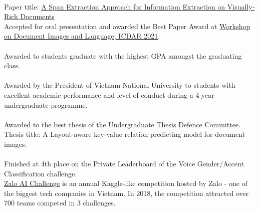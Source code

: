 \\
Paper title: \href{https://aps.arxiv.org/abs/2106.00978}{A Span Extraction Approach for Information Extraction on Visually-Rich Documents}\\
\indent Accepted for oral presentation and awarded the Best Paper Award at \href{https://dil2021.github.io/index.html}{Workshop on Document Images and Language, ICDAR 2021}.\\

\\
Awarded to students graduate with the highest GPA amongst the graduating
class.\\

\\
Awarded by the President of Vietnam National University to students with
excellent academic performance and level of conduct during a 4-year
undergraduate programme.\\

\\
Awarded to the best thesis of the Undergraduate Thesis Defence Committee.\\
\indent Thesis title: A Layout-aware key-value relation predicting model for
document images.\\



\\
Finished at 4th place on the Private Leaderboard of the Voice Gender/Accent Classification challenge.\\
\indent \href{https://challenge.zalo.ai}{Zalo AI Challenge} is an annual Kaggle-like competition hosted
by Zalo - one of the biggest tech companies in Vietnam. In 2018, the competition attracted
over 700 teams competed in 3 challenges.\\

